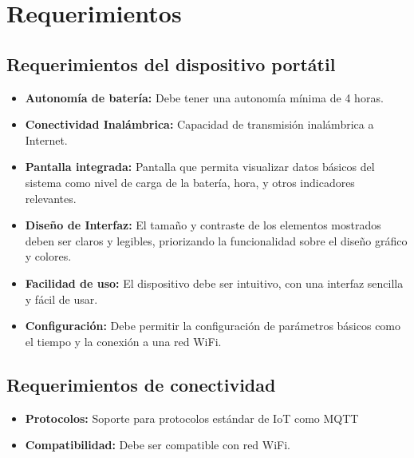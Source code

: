 \newpage

\section{Requerimientos}

\subsection{Requerimientos del dispositivo portátil}

\begin{itemize}

    \item \textbf{Autonomía de batería: }Debe tener una autonomía mínima de 4 horas.
    \item \textbf{Conectividad Inalámbrica:} Capacidad de transmisión inalámbrica a Internet.
    \item \textbf{Pantalla integrada:} Pantalla que permita visualizar datos básicos del sistema como nivel de carga de la batería, hora, y otros indicadores relevantes.
    \item \textbf{Diseño de Interfaz:} El tamaño y contraste de los elementos mostrados deben ser claros y legibles, priorizando la funcionalidad sobre el diseño gráfico y colores.
    \item \textbf{Facilidad de uso:} El dispositivo debe ser intuitivo, con una interfaz sencilla y fácil de usar.
    \item \textbf{Configuración:} Debe permitir la configuración de parámetros básicos como el tiempo y la conexión a una red WiFi.

\end{itemize}
\subsection{Requerimientos de conectividad}

\begin{itemize}

    \item \textbf{Protocolos:} Soporte para protocolos estándar de IoT como MQTT
    \item \textbf{Compatibilidad:} Debe ser compatible con red WiFi.
    
\end{itemize}

